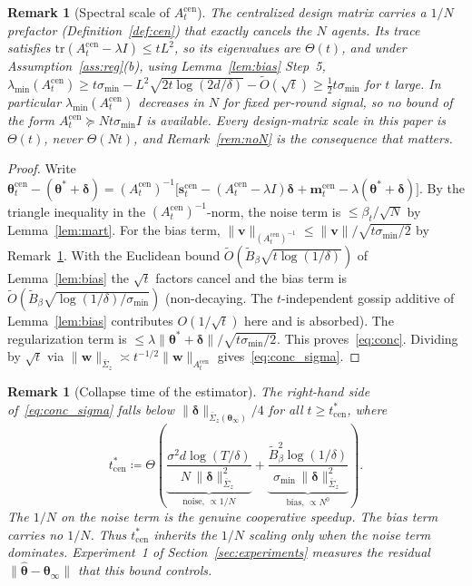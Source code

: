 \documentclass[11pt]{article}
\newtheorem{remark}[theorem]{Remark}
\newcommand{\Ot}{\widetilde{O}}
\begin{document}
\begin{remark}[Spectral scale of $A_t^{\mathrm{cen}}$]\label{rem:spectral}
The centralized design matrix carries a $1/N$ prefactor
(Definition~\ref{def:cen}) that exactly cancels the $N$ agents. Its
trace satisfies
$\mathrm{tr}(A_t^{\mathrm{cen}}-\lambda I)\leq tL^2$, so its eigenvalues
are $\Theta(t)$, and under Assumption~\ref{ass:reg}(b),
using Lemma~\ref{lem:bias} Step~5,
$\lambda_{\min}(A_t^{\mathrm{cen}})\geq
t\sigma_{\min}-L^2\sqrt{2t\log(2d/\delta)}-\Ot(\sqrt t)
\geq\tfrac12 t\sigma_{\min}$ for $t$ large.
In particular $\lambda_{\min}(A_t^{\mathrm{cen}})$
\emph{decreases} in $N$ for fixed per-round signal, so no bound of the
form $A_t^{\mathrm{cen}}\succeq Nt\sigma_{\min}I$ is available. Every
design-matrix scale in this paper is $\Theta(t)$, never $\Theta(Nt)$,
and Remark~\ref{rem:noN} is the consequence that matters.
\end{remark}

\begin{proof}
Write
$\bm{\theta}_t^{\mathrm{cen}}-(\bm{\theta}^{\!*}+\bm{\delta})
=(A_t^{\mathrm{cen}})^{-1}\bigl[\bm{s}_t^{\mathrm{cen}}
-(A_t^{\mathrm{cen}}-\lambda I)\bm{\delta}
+\bm{m}_t^{\mathrm{cen}}-\lambda(\bm{\theta}^{\!*}+\bm{\delta})\bigr]$.
By the triangle inequality in the $(A_t^{\mathrm{cen}})^{-1}$-norm,
the noise term is $\leq\beta_t/\sqrt N$ by Lemma~\ref{lem:mart}.
For the bias term, $\|\bm{v}\|_{(A_t^{\mathrm{cen}})^{-1}}\leq
\|\bm{v}\|/\sqrt{t\sigma_{\min}/2}$ by Remark~\ref{rem:spectral}. With
the Euclidean bound $\Ot(\widetilde B_\beta\sqrt{t\log(1/\delta)})$
of Lemma~\ref{lem:bias} the $\sqrt t$ factors cancel and the bias term
is $\Ot(\widetilde B_\beta\sqrt{\log(1/\delta)/\sigma_{\min}})$
(non-decaying. The $t$-independent gossip additive of
Lemma~\ref{lem:bias} contributes $O(1/\sqrt t)$ here and is absorbed).
The regularization term is
$\leq\lambda\|\bm{\theta}^{\!*}+\bm{\delta}\|/\sqrt{t\sigma_{\min}/2}$.
This proves~\eqref{eq:conc}. Dividing by $\sqrt t$ via
$\|\bm{w}\|_{\bar{\Sigma}_z}\asymp t^{-1/2}\|\bm{w}\|_{A_t^{\mathrm{cen}}}$
gives~\eqref{eq:conc_sigma}.
\end{proof}

\begin{remark}[Collapse time of the estimator]\label{rem:tstar}
The right-hand side of~\eqref{eq:conc_sigma} falls below
$\|\bm{\delta}\|_{\bar{\Sigma}_z(\bm{\theta}_\infty)}/4$
for all $t\geq t_{\mathrm{cen}}^*$, where
\begin{equation}
t_{\mathrm{cen}}^*\coloneqq\Theta\!\left(
\underbrace{\frac{\sigma^2 d\log(T/\delta)}{N\,\|\bm{\delta}\|_{\bar{\Sigma}_z}^2}}_{\text{noise, }\propto 1/N}
+\underbrace{\frac{\widetilde B_\beta^2\log(1/\delta)}{\sigma_{\min}\,\|\bm{\delta}\|_{\bar{\Sigma}_z}^2}}_{\text{bias, }\propto N^0}
\right).
\label{eq:tcen_def}
\end{equation}
The $1/N$ on the noise term is the genuine cooperative speedup. The
bias term carries no $1/N$.  Thus $t_{\mathrm{cen}}^*$ inherits the
$1/N$ scaling only when the noise term dominates.  Experiment~1 of
Section~\ref{sec:experiments} measures the residual
$\|\widehat{\bm\theta}-\bm\theta_\infty\|$ that this bound controls.
\end{remark}
\end{document}
